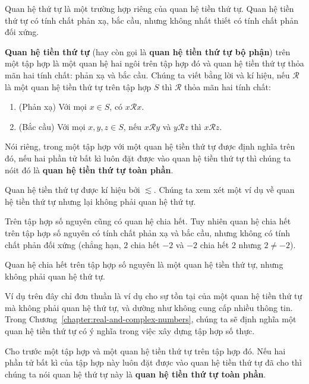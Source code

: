 Quan hệ thứ tự là một trường hợp riêng của quan hệ tiền thứ tự. Quan hệ tiền thứ tự có tính chất phản xạ, bắc cầu, nhưng không nhất thiết có tính chất phản đối xứng.

\begin{definition}
    \textbf{Quan hệ tiền thứ tự} (hay còn gọi là \textbf{quan hệ tiền thứ tự bộ phận}) trên một tập hợp là một quan hệ hai ngôi trên tập hợp đó và quan hệ tiền thứ tự thỏa mãn hai tính chất: phản xạ và bắc cầu. Chúng ta viết bằng lời và kí hiệu, nếu $\mathscr{R}$ là một quan hệ tiền thứ tự trên tập hợp $S$ thì $\mathscr{R}$ thỏa mãn hai tính chất:
    \begin{enumerate}[label={(\roman*)}]
        \item (Phản xạ) Với mọi $x\in S$, có $x\mathscr{R}x$.
        \item (Bắc cầu) Với mọi $x, y, z\in S$, nếu $x\mathscr{R}y$ và $y\mathscr{R}z$ thì $x\mathscr{R}z$.
    \end{enumerate}

    \noindent Nói riêng, trong một tập hợp với một quan hệ tiền thứ tự được định nghĩa trên đó, nếu hai phần tử bất kì luôn đặt được vào quan hệ tiền thứ tự thì chúng ta nóit đó là \textbf{quan hệ tiền thứ tự toàn phần}.
\end{definition}

Quan hệ tiền thứ tự được kí hiệu bởi $\lesssim$. Chúng ta xem xét một ví dụ về quan hệ tiền thứ tự nhưng lại không phải quan hệ thứ tự.

\begin{example}
    Trên tập hợp số nguyên cũng có quan hệ chia hết. Tuy nhiên quan hệ chia hết trên tập hợp số nguyên có tính chất phản xạ và bắc cầu, nhưng không có tính chất phản đối xứng (chẳng hạn, $2$ chia hết $-2$ và $-2$ chia hết $2$ nhưng $2\ne -2$).

    \noindent Quan hệ chia hết trên tập hợp số nguyên là một quan hệ tiền thứ tự, nhưng không phải quan hệ thứ tự.
\end{example}

Ví dụ trên đây chỉ đơn thuần là ví dụ cho sự tồn tại của một quan hệ tiền thứ tự mà không phải quan hệ thứ tự, và dường như không cung cấp nhiều thông tin. Trong Chương~\ref{chapter:real-and-complex-numbers}, chúng ta sẽ định nghĩa một quan hệ tiền thứ tự có ý nghĩa trong việc xây dựng tập hợp số thực.

\begin{definition}
    Cho trước một tập hợp và một quan hệ tiền thứ tự trên tập hợp đó. Nếu hai phần tử bất kì của tập hợp này luôn đặt được vào quan hệ tiền thứ tự đã cho thì chúng ta nói quan hệ thứ tự này là \textbf{quan hệ tiền thứ tự toàn phần}.
\end{definition}


